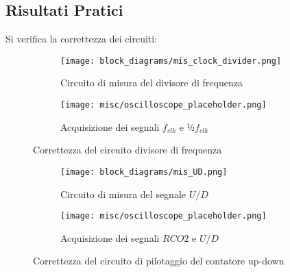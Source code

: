 
\subsection*{Risultati Pratici}


Si verifica la correttezza dei circuiti:

\begin{figure}[H]
    \centering

    \begin{subfigure}{.5\textwidth}
        \centering
        \texttt{[image: block\_diagrams/mis\_clock\_divider.png]}
        \caption{Circuito di misura del divisore di frequenza}
        \label{mis_clock_divider}
    \end{subfigure}%
    \begin{subfigure}{.5\textwidth}
        \centering
        \texttt{[image: misc/oscilloscope\_placeholder.png]}
        \caption{Acquisizione dei segnali $f_{clk}$ e ½$f_{clk}$}
        \label{acq_clock_divider}
    \end{subfigure}

    \caption{Correttezza del circuito divisore di frequenza}
    \label{clock_divider}
\end{figure}

\begin{figure}[H]
    \centering

    \begin{subfigure}{.5\textwidth}
        \centering
        \texttt{[image: block\_diagrams/mis\_UD.png]}
        \caption{Circuito di misura del segnale $U/D$}
        \label{mis_UD}
    \end{subfigure}%
    \begin{subfigure}{.5\textwidth}
        \centering
        \texttt{[image: misc/oscilloscope\_placeholder.png]}
        \caption{Acquisizione dei segnali $RCO2$ e $U/D$}
        \label{acq_UD}
    \end{subfigure}

    \caption{Correttezza del circuito di pilotaggio del contatore up-down}
    \label{UD}
\end{figure}


